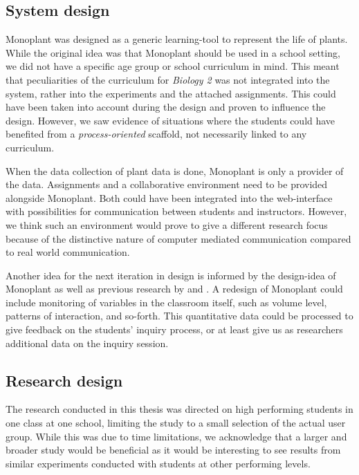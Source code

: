 \subsection{System design}
Monoplant was designed as a generic learning-tool to represent the life of plants. While the original idea was that Monoplant should be used in a school setting, we did not have a specific age group or school curriculum in mind. This meant that peculiarities of the curriculum for \emph{Biology 2} was not integrated into the system, rather into the experiments and the attached assignments. This could have been taken into account during the design and proven to influence the design. However, we saw evidence of situations where the students could have benefited from a \emph{process-oriented} scaffold, not necessarily linked to any curriculum.

When the data collection of plant data is done, Monoplant is only a provider of the data. Assignments and a collaborative environment need to be provided alongside Monoplant. Both could have been integrated into the web-interface with possibilities for communication between students and instructors. However, we think such an environment would prove to give a different research focus because of the distinctive nature of computer mediated communication compared to real world communication. 

Another idea for the next iteration in design is informed by the design-idea of Monoplant as well as previous research by \citet{fischer1991critics} and \citet{furberg2009socio}. A redesign of Monoplant could include monitoring of variables in the classroom itself, such as volume level, patterns of interaction, and so-forth. This quantitative data could be processed to give feedback on the students' inquiry process, or at least give us as researchers additional data on the inquiry session.

\subsection{Research design}
The research conducted in this thesis was directed on high performing students in one class at one school, limiting the study to a small selection of the actual user group. While this was due to time limitations, we acknowledge that a larger and broader study would be beneficial as it would be interesting to see results from similar experiments conducted with students at other performing levels.

